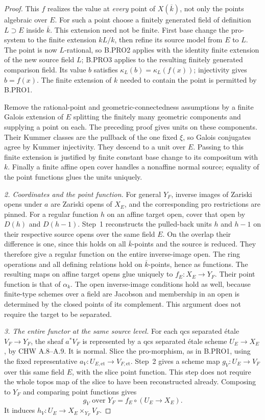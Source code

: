 \begin{proof}
This \(f\) realizes the value at \emph{every} point of
\(X(\overline k)\), not only the points algebraic over \(E\).
For such a point choose a finitely generated field of definition
\(L\supset E\) inside \(\overline k\). This extension need
not be finite. First base change the pro-system to the finite
extension \(kL/k\), then refine its source model from \(E\)
to \(L\). The point is now \(L\)-rational, so B.PRO2 applies
with the identity finite extension of the new source field
\(L\); B.PRO3 applies to the resulting finitely generated
comparison field. Its value \(b\) satisfies
\(\kappa_L(b)=\kappa_L(f(x))\); injectivity gives
\(b=f(x)\). The finite extension of \(k\) needed to contain
the point is permitted by B.PRO1.

Remove the rational-point and geometric-connectedness assumptions
by a finite Galois extension of \(E\) splitting the finitely
many geometric components and supplying a point on each. The
preceding proof gives units on these components. Their Kummer
classes are the pullback of the one fixed \(\xi\), so Galois
conjugates agree by Kummer injectivity. They descend to a unit
over \(E\). Passing to this finite extension is justified by
finite constant base change to its compositum with \(k\).
Finally a finite affine open cover handles a nonaffine normal
source; equality of the point functions glues the units uniquely.

\emph{2. Coordinates and the point function.}
For general \(Y_F\), inverse images of Zariski opens under
\(a\) are Zariski opens of \(X_E\), and the corresponding pro
restrictions are pinned. For a regular function \(h\) on an
affine target open, cover that open by \(D(h)\) and \(D(h-1)\).
Step~1 reconstructs the pulled-back units \(h\) and \(h-1\)
on their respective source opens over the same field \(E\).
On the overlap their difference is one, since this holds on
all \(\overline k\)-points and the source is reduced. They
therefore give a regular function on the entire inverse-image
open. The ring operations and all defining relations hold on
\(\overline k\)-points, hence as functions. The resulting maps
on affine target opens glue uniquely to
\(f_E:X_E\to Y_F\). Their point function is that of
\(\alpha_k\). The open inverse-image conditions hold as well,
because finite-type schemes over a field are Jacobson and
membership in an open is determined by the closed points of
its complement. This argument does not require the target to
be separated.

\emph{3. The entire functor at the same source level.}
For each qcs separated étale \(V_F\to Y_F\), the sheaf
\(a^*V_F\) is represented by a qcs separated étale scheme
\(U_E\to X_E\), by CHW A.8--A.9. It is normal. Slice the
pro-morphism, as in B.PRO1, using the fixed representative
\(a_V:U_{E,\mathrm{et}}\to V_{F,\mathrm{et}}\).
Step~2 gives a scheme map \(g_V:U_E\to V_F\) over this
same field \(E\), with the slice point function. This step
does not require the whole topos map of the slice to have been
reconstructed already. Composing to \(Y_F\) and comparing
point functions gives
\[
                 g_V\text{ over }Y_F
                    = f_E\circ(U_E\to X_E).
\]
It induces \(h_V:U_E\to X_E\times_{Y_F}V_F\).


\end{proof}
